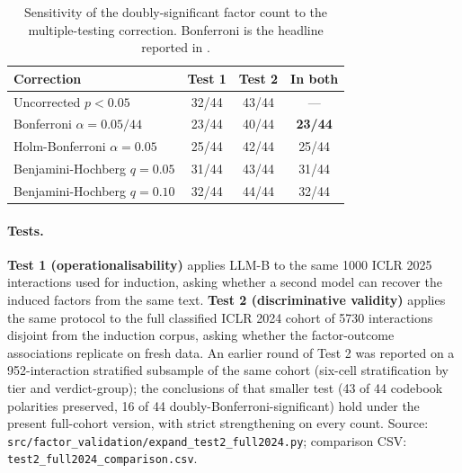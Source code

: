 \documentclass{article}
\newcommand{\code}[1]{\texttt{#1}}
\begin{document}
\begin{table}[htbp]
    \centering
    \caption{Sensitivity of the doubly-significant factor count to the multiple-testing correction. Bonferroni is the headline reported in .}
    \label{tab:mtcorrection}
    \begin{tabular}{lccc}
    \toprule
    Correction & Test 1 & Test 2 & In both \\
    \midrule
    Uncorrected $p < 0.05$              & 32/44 & 43/44 & --- \\
    Bonferroni $\alpha = 0.05 / 44$    & 23/44 & 40/44 & \textbf{23/44} \\
    Holm-Bonferroni $\alpha = 0.05$    & 25/44 & 42/44 & 25/44 \\
    Benjamini-Hochberg $q = 0.05$      & 31/44 & 43/44 & 31/44 \\
    Benjamini-Hochberg $q = 0.10$      & 32/44 & 44/44 & 32/44 \\
    \bottomrule
    \end{tabular}
\end{table}

\paragraph{Tests.}
\textbf{Test 1 (operationalisability)} applies LLM-B to the same \num{1000} ICLR 2025 interactions used for induction, asking whether a second model can recover the induced factors from the same text. \textbf{Test 2 (discriminative validity)} applies the same protocol to the full classified ICLR 2024 cohort of \num{5730} interactions disjoint from the induction corpus, asking whether the factor-outcome associations replicate on fresh data. An earlier round of Test 2 was reported on a \num{952}-interaction stratified subsample of the same cohort (six-cell stratification by tier and verdict-group); the conclusions of that smaller test (43 of 44 codebook polarities preserved, 16 of 44 doubly-Bonferroni-significant) hold under the present full-cohort version, with strict strengthening on every count. Source: \code{src/factor\_validation/expand\_test2\_full2024.py}; comparison CSV: \code{test2\_full2024\_comparison.csv}.
\end{document}
